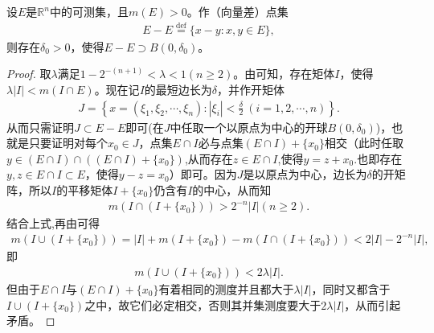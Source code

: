 \documentclass[../../main.tex]{subfiles}
\begin{document}
\begin{theorem}[Steinhaus定理]\label{theorem:Steinhaus定理}
设\(E\)是\(\mathbb{R}^n\)中的可测集，且\(m(E)>0\)。作（向量差）点集
\begin{align*}
E - E \stackrel{\text{def}}{=} \{x - y: x,y \in E\},
\end{align*}
则存在\(\delta_0>0\)，使得\(E - E \supset B(0,\delta_0)\)。
\end{theorem}
\begin{proof}
取\(\lambda\)满足\(1 - 2^{-(n + 1)}<\lambda<1\)$(n\geq 2)$。由可知，存在矩体\(I\)，使得\(\lambda|I|<m(I\cap E)\)。现在记\(I\)的最短边长为\(\delta\)，并作开矩体
\begin{align*}
J = \left\{x = (\xi_1,\xi_2,\cdots,\xi_n): |\xi_i|<\frac{\delta}{2}\ (i = 1,2,\cdots,n)\right\}.
\end{align*}
从而只需证明\(J\subset E - E\)即可(在$J$中任取一个以原点为中心的开球$B(0,\delta_0)$)，也就是只要证明对每个\(x_0\in J\)，点集\(E\cap I\)必与点集\((E\cap I)+\{x_0\}\)相交（此时任取$y\in (E\cap I)\cap((E\cap I)+\{x_0\})$,从而存在$z\in E\cap I$,使得$y=z+x_0$.也即存在\(y,z\in E\cap I\subset E\)，使得\(y - z = x_0\)）即可。因为\(J\)是以原点为中心，边长为\(\delta\)的开矩阵，所以\(I\)的平移矩体\(I+\{x_0\}\)仍含有\(I\)的中心，从而知
\begin{align*}
m(I\cap (I+\{x_0\}))>2^{-n}|I|(n\geq 2).
\end{align*}
结合上式,再由可得
\begin{align*}
m(I\cup (I+\{x_0\}))=|I|+m(I+\{x_0\})-m(I\cap (I+\{x_0\}))
<2|I|-2^{-n}|I|,
\end{align*}
即
\begin{align*}
m(I\cup (I+\{x_0\}))<2\lambda|I|.
\end{align*}
但由于\(E\cap I\)与\((E\cap I)+\{x_0\}\)有着相同的测度并且都大于\(\lambda|I|\)，同时又都含于\(I\cup (I+\{x_0\})\)之中，故它们必定相交，否则其并集测度要大于\(2\lambda|I|\)，从而引起矛盾。
\end{proof} 
\end{document}
